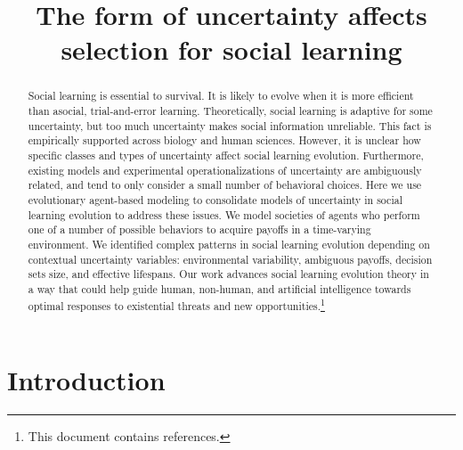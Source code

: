 \documentclass[letterpaper,11.5pt]{scrartcl}
\title{The form of uncertainty affects selection for social learning}
\author{{}}
\begin{document}
\maketitle

\newcommand{\pisub}[1]{\pi_{\mathrm{#1}}}
\newcommand{\pilow}{\pisub{low}}
\newcommand{\pihigh}{\pisub{high}}
\newcommand{\piI}{\langle \pisub{I} \rangle}
\newcommand{\piS}{\langle \pisub{S} \rangle}
\newcommand{\ledger}{\bar\pi_{ib}}

\newcommand{\meanvar}[1]{\langle #1 \rangle}
\newcommand{\meansl}{\meanvar{s}}
\newcommand{\meanpi}{\meanvar{\pi}}
\newcommand{\meansoc}{\meanvar{\pi_\mathrm{S}}}
\newcommand{\meanasoc}{\meanvar{\pi_\mathrm{A}}}
\newcommand{\meanT}{\meanvar{T}}

\newcommand{\bandit}{\text{Bandit}_b(0, 1)}

\begin{abstract}

Social learning is essential to survival. It is likely to evolve when it is more
efficient than asocial, trial-and-error learning. Theoretically, social learning
is adaptive for some uncertainty, but too much uncertainty makes
social information unreliable. This fact is empirically
supported across biology and human sciences. However, it is unclear how
specific classes and types of uncertainty affect social
learning evolution. Furthermore, existing models and experimental operationalizations of
uncertainty are ambiguously related, and 
tend to only consider a small number of behavioral
choices.  Here we use evolutionary agent-based modeling to consolidate
models of uncertainty in social learning evolution to address these issues.
We model societies of agents who perform one of a number
of possible behaviors to acquire payoffs in a time-varying environment.
We identified complex patterns in social learning evolution depending on contextual
uncertainty variables: environmental variability, ambiguous payoffs, 
decision sets size, and effective lifespans. 
Our work advances social learning evolution theory in a way that could help 
guide human, non-human, and artificial intelligence towards optimal responses 
to existential threats and new opportunities.\footnote{This document contains
 references.}  
\end{abstract}


\section{Introduction}
\end{document}
